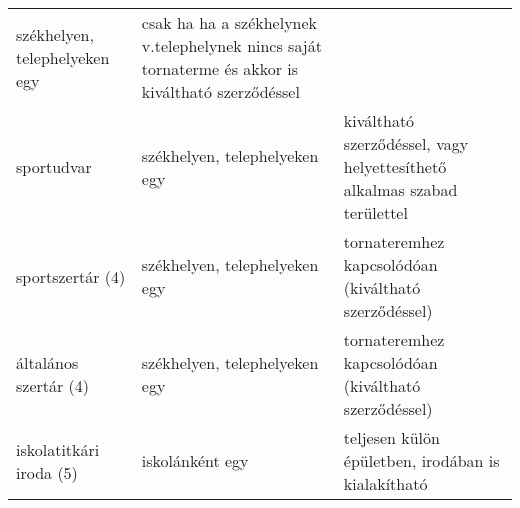 \begin{longtable}[]{@{}lll@{}}
\begin{minipage}[t]{0.26\columnwidth}
székhelyen, telephelyeken egy\strut
\end{minipage} & \begin{minipage}[t]{0.51\columnwidth}\raggedright
csak ha ha a székhelynek v.telephelynek nincs saját tornaterme és akkor
is kiváltható szerződéssel\strut
\end{minipage}\tabularnewline
\begin{minipage}[t]{0.13\columnwidth}\raggedright
sportudvar\strut
\end{minipage} & \begin{minipage}[t]{0.26\columnwidth}\raggedright
székhelyen, telephelyeken egy\strut
\end{minipage} & \begin{minipage}[t]{0.51\columnwidth}\raggedright
kiváltható szerződéssel, vagy helyettesíthető alkalmas szabad
területtel\strut
\end{minipage}\tabularnewline
\begin{minipage}[t]{0.13\columnwidth}\raggedright
sportszertár (4)\strut
\end{minipage} & \begin{minipage}[t]{0.26\columnwidth}\raggedright
székhelyen, telephelyeken egy\strut
\end{minipage} & \begin{minipage}[t]{0.51\columnwidth}\raggedright
tornateremhez kapcsolódóan (kiváltható szerződéssel)\strut
\end{minipage}\tabularnewline
\begin{minipage}[t]{0.13\columnwidth}\raggedright
általános szertár (4)\strut
\end{minipage} & \begin{minipage}[t]{0.26\columnwidth}\raggedright
székhelyen, telephelyeken egy\strut
\end{minipage} & \begin{minipage}[t]{0.51\columnwidth}\raggedright
tornateremhez kapcsolódóan (kiváltható szerződéssel)\strut
\end{minipage}\tabularnewline
\begin{minipage}[t]{0.13\columnwidth}\raggedright
iskolatitkári iroda (5)\strut
\end{minipage} & \begin{minipage}[t]{0.26\columnwidth}\raggedright
iskolánként egy\strut
\end{minipage} & \begin{minipage}[t]{0.51\columnwidth}\raggedright
teljesen külön épületben, irodában is kialakítható\strut
\end{minipage}\tabularnewline

\end{longtable}
